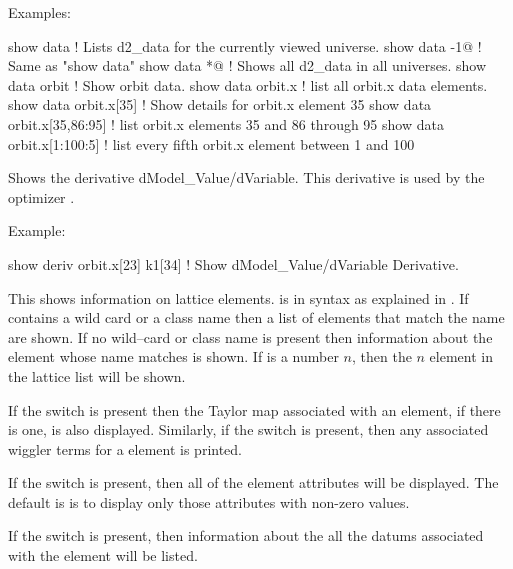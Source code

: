 {{{\begin{description}
Examples:
\begin{example}
  show data                   ! Lists d2_data for the currently viewed universe.
  show data -1@               ! Same as "show data"
  show data *@                ! Shows all d2_data in all universes.
  show data orbit             ! Show orbit data.
  show data orbit.x           ! list all orbit.x data elements.
  show data orbit.x[35]       ! Show details for orbit.x element 35
  show data orbit.x[35,86:95] ! list orbit.x elements 35 and 86 through 95
  show data orbit.x[1:100:5]  ! list every fifth orbit.x element between 1 and 100  
\end{example}


\item[show derivative <data\_name(s)> <var\_name(s)>] \Newline
Shows the derivative dModel\_Value/dVariable. This derivative is used
by the optimizer .

Example:
\begin{example}
  show deriv orbit.x[23] k1[34] ! Show dModel_Value/dVariable Derivative.
\end{example}


\item[show element \{-taylor\} \{-wig\_terms\} \{-data\} 
                     \{-all\_attributes\} <name>] \Newline
This shows information on lattice elements.  is in
 syntax as explained in . If
 contains a wild card or a class name then a list of
elements that match the name are shown. If no wild--card or class name
is present then information about the element whose name matches
 is shown. If  is a number $n$, then the $n$\Th
element in the lattice list will be shown.

If the  switch is present then the Taylor map associated
with an element, if there is one, is also displayed.  Similarly, if the
 switch is present, then any associated wiggler terms for
a   element is printed.

If the  switch is present, then all of the element attributes
will be displayed. The default is is to display only those attributes
with non-zero values.

If the  switch is present, then information about the 
all the datums associated with the element will be listed. 


\end{description}}}}

